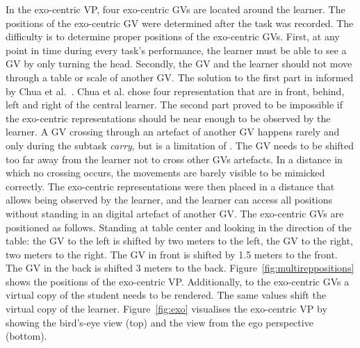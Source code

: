 In the exo-centric VP, four exo-centric GVs are located around the learner. The positions of the exo-centric GV were determined after the task was recorded. The difficulty is to determine proper positions of the exo-centric GVs. First, at any point in time during every task's performance, the learner must be able to see a GV by only turning the head. Secondly, the GV and the learner should not move through a table or scale of another GV. The solution to the first part in informed by Chua et al.~\cite{thaichichua}. Chua et al. chose four representation that are in front, behind, left and right of the central learner. The second part proved to be impossible if the exo-centric representations should be near enough to be observed by the learner. A GV crossing through an artefact of another GV happens rarely and only during the subtask \textit{carry}, but is a limitation of \exgo. The GV needs to be shifted too far away from the learner not to cross other GVs artefacts. In a distance in which no crossing occurs, the movements are barely visible to be mimicked correctly. The exo-centric representations were then placed in a distance that allows being observed by the learner, and the learner can access all positions without standing in an digital artefact of another GV. The exo-centric GVs are positioned as follows. Standing at table center and looking in the direction of the table: the GV to the left is shifted by two meters to the left, the GV to the right, two meters to the right. The GV in front is shifted by 1.5 meters to the front. The GV in the back is shifted 3 meters to the back. Figure~\ref{fig:multireppositions} shows the positions of the exo-centric VP. Additionally, to the exo-centric GVs a virtual copy of the student needs to be rendered. The same values shift the virtual copy of the learner. Figure~\ref{fig:exo} visualises the exo-centric VP by showing the bird's-eye view (top) and the view from the ego perspective (bottom).\\


